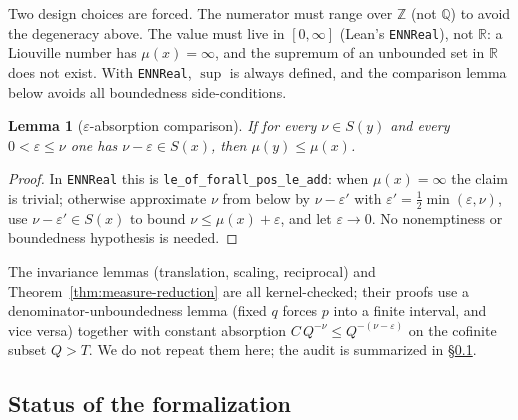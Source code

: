 \documentclass[11pt]{amsart}
\newtheorem{lemma}[theorem]{Lemma}
\theoremstyle{definition}
\theoremstyle{remark}
\numberwithin{equation}{section}
\newcommand{\Q}{\mathbb{Q}}
\newcommand{\R}{\mathbb{R}}
\newcommand{\Z}{\mathbb{Z}}
\newcommand{\irr}{\mu}
\begin{document}
Two design choices are forced. The numerator must range over $\Z$ (not $\Q$) to avoid the degeneracy above. The value must live in $[0,\infty]$ (Lean's \texttt{ENNReal}), not $\R$: a Liouville number has $\irr(x)=\infty$, and the supremum of an unbounded set in $\R$ does not exist. With \texttt{ENNReal}, $\sup$ is always defined, and the comparison lemma below avoids all boundedness side-conditions.

\begin{lemma}[$\varepsilon$-absorption comparison]\label{lem:eps-abs}
If for every $\nu\in S(y)$ and every $0<\varepsilon\le\nu$ one has $\nu-\varepsilon\in S(x)$, then $\irr(y)\le\irr(x)$.
\end{lemma}
\begin{proof}
In \texttt{ENNReal} this is \texttt{le\_\allowbreak{}of\_\allowbreak{}forall\_\allowbreak{}pos\_\allowbreak{}le\_\allowbreak{}add}: when $\irr(x)=\infty$ the claim is trivial; otherwise approximate $\nu$ from below by $\nu-\varepsilon'$ with $\varepsilon'=\tfrac12\min(\varepsilon,\nu)$, use $\nu-\varepsilon'\in S(x)$ to bound $\nu\le\irr(x)+\varepsilon$, and let $\varepsilon\to0$. No nonemptiness or boundedness hypothesis is needed.
\end{proof}

The invariance lemmas (translation, scaling, reciprocal) and Theorem~\ref{thm:measure-reduction} are all kernel-checked; their proofs use a denominator-unboundedness lemma (fixed $q$ forces $p$ into a finite interval, and vice versa) together with constant absorption $C\,Q^{-\nu}\le Q^{-(\nu-\varepsilon)}$ on the cofinite subset $Q>T$. We do not repeat them here; the audit is summarized in \S\ref{sec:lean-status}.

\subsection{Status of the formalization}\label{sec:lean-status}
\end{document}
